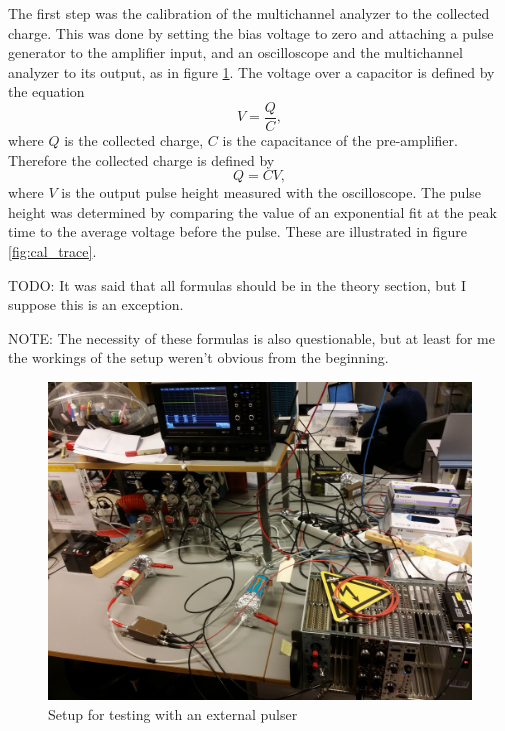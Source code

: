 \documentclass[a4paper]{article}
\begin{document}
\FloatBarrier
The first step was the calibration of the multichannel analyzer to the collected charge.
This was done by setting the bias voltage to zero and attaching a pulse generator to the amplifier input, and an oscilloscope and the multichannel analyzer to its output, as in figure \ref{fig:pulser_setup}.
The voltage over a capacitor is defined by the equation
\begin{equation}
V = \frac{Q}{C},
\end{equation}
where $Q$ is the collected charge, $C$ is the capacitance of the pre-amplifier.
Therefore the collected charge is defined by
\begin{equation}
Q = CV,
\end{equation}
where $V$ is the output pulse height measured with the oscilloscope.
The pulse height was determined by comparing the value of an exponential fit at the peak time to the average voltage before the pulse.
These are illustrated in figure \ref{fig:cal_trace}.

TODO: It was said that all formulas should be in the theory section, but I suppose this is an exception.

NOTE: The necessity of these formulas is also questionable, but at least for me the workings of the setup weren't obvious from the beginning.

\begin{figure}[ht!]
\centering
\includegraphics[width=\textwidth]{fig/IMG_20201130_135000.jpg}
\caption{Setup for testing with an external pulser}
\label{fig:pulser_setup}
\end{figure}
\end{document}
